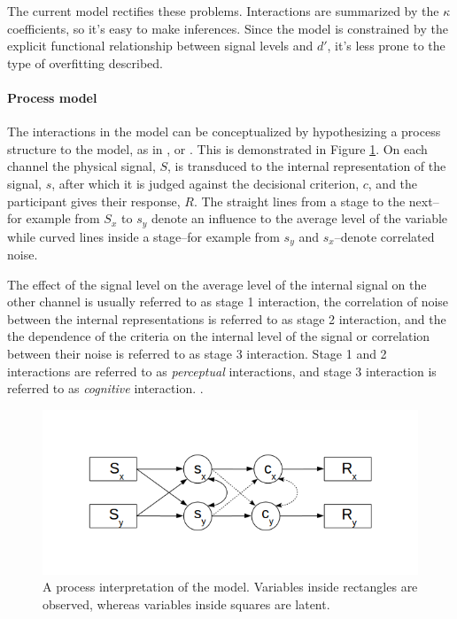 \documentclass{article}\usepackage{knitr}
\begin{document}
The current model rectifies these problems. Interactions are summarized by the $\kappa$ coefficients, so it's easy to make inferences. Since the model is constrained by the explicit functional relationship between signal levels and $d'$, it's less prone to the type of overfitting described. 

\paragraph{Process model}

The interactions in the model can be conceptualized by hypothesizing a process structure to the model, as in \cite{ashby1989}, \cite{ashby2000} or \cite{cohen2003}. This is demonstrated in Figure \ref{fig:GRTprocess}. On each channel the physical signal, $S$, is transduced to the internal representation of the signal, $s$, after which it is judged against the decisional criterion, $c$, and the participant gives their response, $R$. The straight lines from a stage to the next--for example from $S_x$ to $s_y$ denote an influence to the average level of the variable while curved lines inside a stage--for example from $s_y$ and $s_x$--denote correlated noise. 

The effect of the signal level on the average level of the internal signal on the other channel is usually referred to as stage 1 interaction, the correlation of noise between the internal representations is referred to as stage 2 interaction, and the the dependence of the criteria on the internal level of the signal or correlation between their noise is referred to as stage 3 interaction. Stage 1 and 2 interactions are referred to as \textit{perceptual} interactions, and stage 3 interaction is referred to as \textit{cognitive} interaction. \citep{ashby1989, ashby2000, cohen2003}. 

\begin{figure}[!htb]
\centering
\includegraphics[scale = 0.8]{Process_model}
\caption{A process interpretation of the model. Variables inside rectangles are observed, whereas variables inside squares are latent. }
\label{fig:GRTprocess}
\end{figure}
\end{document}

